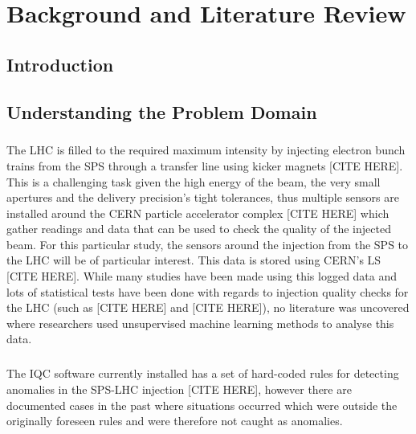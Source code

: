 \chapter{Background and Literature Review}
\section{Introduction}

\section{Understanding the Problem Domain}


\paragraph{ }The \acs{LHC} is filled to the required maximum intensity by injecting electron bunch trains from the \acs{SPS} through a transfer line using kicker magnets [CITE HERE]. This is a challenging task given the high energy of the beam, the very small apertures and the delivery precision's tight tolerances, thus multiple sensors are installed around the \acs{CERN} particle accelerator complex [CITE HERE] which gather readings and data that can be used to check the quality of the injected beam. For this particular study, the sensors around the injection from the \acs{SPS} to the \acs{LHC} will be of particular interest. This data is stored using \acs{CERN}'s \ac{LS} [CITE HERE]. While many studies have been made using this logged data and lots of statistical tests have been done with regards to injection quality checks for the \acs{LHC} (such as [CITE HERE] and [CITE HERE]), no literature was uncovered where researchers used unsupervised machine learning methods to analyse this data.

\paragraph{ }The \ac{IQC} software currently installed has a set of hard-coded rules for detecting anomalies in the \acs{SPS}-\acs{LHC} injection [CITE HERE], however there are documented cases in the past where situations occurred which were outside the originally foreseen rules and were therefore not caught as anomalies.